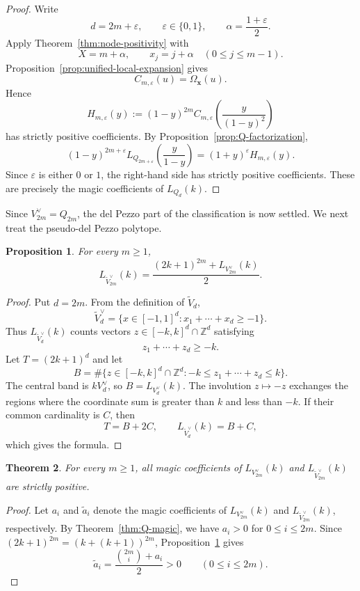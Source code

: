 \documentclass[12pt]{amsart}
\newtheorem{Theorem}{Theorem}[section]
\newtheorem{Proposition}[Theorem]{Proposition}
\theoremstyle{definition}
\newcommand{\ZZ}{\mathbb Z}
\begin{document}
\begin{proof}
Write
\[
d=2m+\varepsilon,
\qquad
\varepsilon\in\{0,1\},
\qquad
\alpha=\frac{1+\varepsilon}{2}.
\]
Apply Theorem~\ref{thm:node-positivity} with
\[
X=m+\alpha,
\qquad
x_j=j+\alpha
\quad(0\le j\le m-1).
\]
Proposition~\ref{prop:unified-local-expansion} gives
\[
C_{m,\varepsilon}(u)=\Omega_{\mathbf x}(u).
\]
Hence
\[
H_{m,\varepsilon}(y)
:=
(1-y)^{2m}
C_{m,\varepsilon}\left(\frac{y}{(1-y)^2}\right)
\]
has strictly positive coefficients.  By
Proposition~\ref{prop:Q-factorization},
\[
(1-y)^{2m+\varepsilon}
L_{Q_{2m+\varepsilon}}\left(\frac{y}{1-y}\right)
=
(1+y)^\varepsilon
H_{m,\varepsilon}(y).
\]
Since $\varepsilon$ is either $0$ or $1$, the right-hand side has strictly
positive coefficients.  These are precisely the magic coefficients of
$L_{Q_d}(k)$.
\end{proof}

Since $V_{2m}^\vee=Q_{2m}$, the del Pezzo part of the classification is now
settled.  We next treat the pseudo-del Pezzo polytope.

\begin{Proposition}\label{prop:pseudo-average}
For every $m\ge1$,
\[
L_{\widetilde V_{2m}^\vee}(k)
=
\frac{(2k+1)^{2m}+L_{V_{2m}^\vee}(k)}2.
\]
\end{Proposition}

\begin{proof}
Put $d=2m$.  From the definition of $\widetilde V_d$,
\[
\widetilde V_d^\vee
=
\{x\in[-1,1]^d:x_1+\cdots+x_d\ge-1\}.
\]
Thus $L_{\widetilde V_d^\vee}(k)$ counts vectors
$z\in[-k,k]^d\cap\ZZ^d$ satisfying
\[
z_1+\cdots+z_d\ge-k.
\]
Let $T=(2k+1)^d$ and let
\[
B
=
\#\{z\in[-k,k]^d\cap\ZZ^d:
-k\le z_1+\cdots+z_d\le k\}.
\]
The central band is $kV_d^\vee$, so $B=L_{V_d^\vee}(k)$.  The involution
$z\mapsto-z$ exchanges the regions where the coordinate sum is greater
than $k$ and less than $-k$.  If their common cardinality is $C$, then
\[
T=B+2C,
\qquad
L_{\widetilde V_d^\vee}(k)=B+C,
\]
which gives the formula.
\end{proof}

\begin{Theorem}\label{thm:building-blocks}
For every $m\ge1$, all magic coefficients of
$L_{V_{2m}^\vee}(k)$ and $L_{\widetilde V_{2m}^\vee}(k)$
are strictly positive.
\end{Theorem}

\begin{proof}
Let $a_i$ and $\widetilde a_i$ denote the magic coefficients of
$L_{V_{2m}^\vee}(k)$ and $L_{\widetilde V_{2m}^\vee}(k)$,
respectively.
By Theorem~\ref{thm:Q-magic}, we have $a_i>0$ for $0\le i\le2m$.
Since $(2k+1)^{2m}=(k+(k+1))^{2m}$,
Proposition~\ref{prop:pseudo-average} gives
\[
\widetilde a_i
=
\frac{\binom{2m}{i}+a_i}{2}>0
\qquad(0\le i\le2m).
\]
\end{proof}
\end{document}
